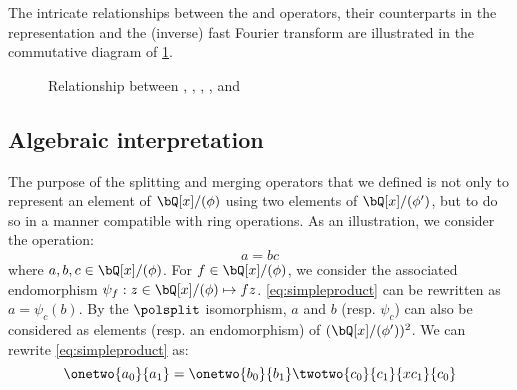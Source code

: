 
The intricate relationships between the \polsplit and \polmerge operators, their counterparts in the \fft representation and the (inverse) fast Fourier transform are illustrated in the commutative diagram of \cref{fig:splitmerge}.

\begin{figure}%
\centering
{}
\caption{Relationship between \fft, \ifft, \polsplit, \polmerge, \splitfft and \mergefft}\label{fig:splitmerge}
\end{figure}

\subsection{Algebraic interpretation}\label{sec:spec:splitmerge:algebraic}

  The purpose of the splitting and merging operators that we defined is not only to represent an element of $\bQ[x]/(\phi)$ using two elements of $\bQ[x]/(\phi')$, but to do so in a manner compatible with ring operations. As an illustration, we consider the operation:
 \begin{equation}\label{eq:simpleproduct}
 a = b c
 \end{equation}
where $a, b, c \in \bQ[x]/(\phi)$. For $f \in \bQ[x]/(\phi)$, we consider the associated endomorphism $\psi_f : z \in \bQ[x]/(\phi) \mapsto fz$. \eqref{eq:simpleproduct} can be rewritten as $a = \psi_c(b)$. By the $\polsplit$ isomorphism, $a$ and $b$ (resp. $\psi_c$) can also be considered as elements (resp. an endomorphism) of $(\bQ[x]/(\phi'))^2$. We can rewrite \eqref{eq:simpleproduct} as:
   \begin{equation}\label{eq:bisection}
  \onetwo{a_0}{a_1} = \onetwo{b_0}{b_1}  \twotwo{c_{0}}{c_{1}}{x c_{1}}{c_{0}}
   \end{equation}

